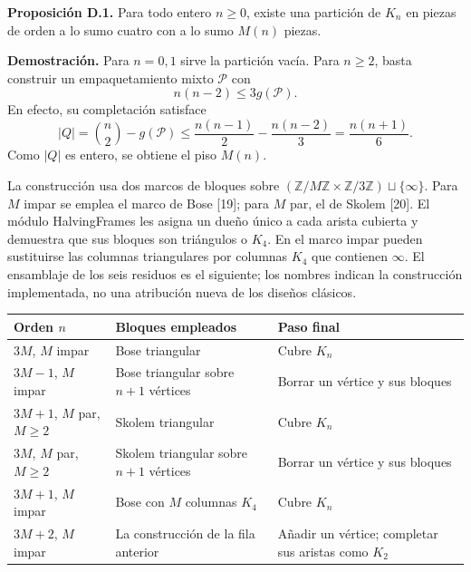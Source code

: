 \documentclass[spanish,11pt,a4paper]{article}
\newcounter{none}
\begin{document}
\textbf{Proposición D.1.} Para todo entero \(n\ge0\), existe una partición de \(K_n\) en piezas de orden a lo sumo cuatro con a lo sumo \(M(n)\) piezas.

\textbf{Demostración.} Para \(n=0,1\) sirve la partición vacía. Para \(n\ge2\), basta construir un empaquetamiento mixto \(\mathcal P\) con \[
n(n-2)\le3g(\mathcal P).
\tag{D.1}
\] En efecto, su completación satisface \[
|Q|=\binom n2-g(\mathcal P)
\le\frac{n(n-1)}2-\frac{n(n-2)}3
=\frac{n(n+1)}6.
\tag{D.2}
\] Como \(|Q|\) es entero, se obtiene el piso \(M(n)\).

La construcción usa dos marcos de bloques sobre \((\mathbb Z/M\mathbb Z\times\mathbb Z/3\mathbb Z)\sqcup\{\infty\}\). Para \(M\) impar se emplea el marco de Bose {[}19{]}; para \(M\) par, el de Skolem {[}20{]}. El módulo {\ttfamily\small HalvingFrame\discretionary{\hbox{\ensuremath{\hookrightarrow}}}{}{}s} les asigna un dueño único a cada arista cubierta y demuestra que sus bloques son triángulos o \(K_4\). En el marco impar pueden sustituirse las columnas triangulares por columnas \(K_4\) que contienen \(\infty\). El ensamblaje de los seis residuos es el siguiente; los nombres indican la construcción implementada, no una atribución nueva de los diseños clásicos.


{\def\LTcaptype{none} %
\begin{longtable}[c]{@{}
  >{\raggedright\arraybackslash}p{}
  >{\raggedright\arraybackslash}p{}
  >{\raggedright\arraybackslash}p{}@{}}
\toprule\noalign{}
\begin{minipage}[b]{\linewidth}\raggedright
Orden \(n\)
\end{minipage} & \begin{minipage}[b]{\linewidth}\raggedright
Bloques empleados
\end{minipage} & \begin{minipage}[b]{\linewidth}\raggedright
Paso final
\end{minipage} \\
\midrule\noalign{}
\endhead
\bottomrule\noalign{}
\endlastfoot
\(3M\), \(M\) impar & Bose triangular & Cubre \(K_n\) \\
\(3M-1\), \(M\) impar & Bose triangular sobre \(n+1\) vértices & Borrar un vértice y sus bloques \\
\(3M+1\), \(M\) par, \(M\ge2\) & Skolem triangular & Cubre \(K_n\) \\
\(3M\), \(M\) par, \(M\ge2\) & Skolem triangular sobre \(n+1\) vértices & Borrar un vértice y sus bloques \\
\(3M+1\), \(M\) impar & Bose con \(M\) columnas \(K_4\) & Cubre \(K_n\) \\
\(3M+2\), \(M\) impar & La construcción de la fila anterior & Añadir un vértice; completar sus aristas como \(K_2\) \\
\end{longtable}
}
\end{document}
